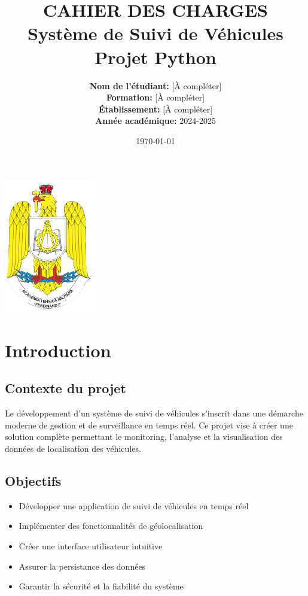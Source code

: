 \documentclass[12pt,a4paper]{article}
\title{
    \vspace{-2cm}
    \Huge\textbf{CAHIER DES CHARGES}\\
    \vspace{0.5cm}
    \Large Système de Suivi de Véhicules\\
    \vspace{0.3cm}
    \large Projet Python
}
\author{
    \textbf{Nom de l'étudiant:} [À compléter]\\
    \textbf{Formation:} [À compléter]\\
    \textbf{Établissement:} [À compléter]\\
    \textbf{Année académique:} 2024-2025
}
\date{\today}
\begin{document}
\maketitle
\thispagestyle{empty}

\vfill

\begin{center}
    \includegraphics[width=0.3\textwidth]{logo_etablissement.png} %
\end{center}

\vfill

\newpage

\tableofcontents
\newpage

\section{Introduction}

\subsection{Contexte du projet}

\lipsum[1-2]

Le développement d'un système de suivi de véhicules s'inscrit dans une démarche moderne de gestion et de surveillance en temps réel. Ce projet vise à créer une solution complète permettant le monitoring, l'analyse et la visualisation des données de localisation des véhicules.

\subsection{Objectifs}

\begin{itemize}
    \item Développer une application de suivi de véhicules en temps réel
    \item Implémenter des fonctionnalités de géolocalisation
    \item Créer une interface utilisateur intuitive
    \item Assurer la persistance des données
    \item Garantir la sécurité et la fiabilité du système
\end{itemize}
\end{document}
